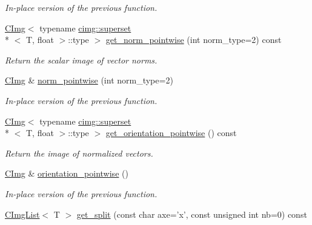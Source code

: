\begin{DoxyCompactItemize}
\begin{DoxyCompactList}\small\item\em In-\/place version of the previous function. \end{DoxyCompactList}\item 
\hyperlink{structcimg__library_1_1_c_img}{C\-Img}$<$ typename \hyperlink{structcimg__library_1_1cimg_1_1superset}{cimg\-::superset}\\*
$<$ T, float $>$\-::type $>$ \hyperlink{structcimg__library_1_1_c_img_a468e303545c56e068bf2f8e90b203be2}{get\-\_\-norm\-\_\-pointwise} (int norm\-\_\-type=2) const 
\begin{DoxyCompactList}\small\item\em Return the scalar image of vector norms. \end{DoxyCompactList}\item 
\hypertarget{structcimg__library_1_1_c_img_a2c7af7a94c6ada6645257c8cd0ffa791}{\hyperlink{structcimg__library_1_1_c_img}{C\-Img} \& \hyperlink{structcimg__library_1_1_c_img_a2c7af7a94c6ada6645257c8cd0ffa791}{norm\-\_\-pointwise} (int norm\-\_\-type=2)}\label{structcimg__library_1_1_c_img_a2c7af7a94c6ada6645257c8cd0ffa791}

\begin{DoxyCompactList}\small\item\em In-\/place version of the previous function. \end{DoxyCompactList}\item 
\hyperlink{structcimg__library_1_1_c_img}{C\-Img}$<$ typename \hyperlink{structcimg__library_1_1cimg_1_1superset}{cimg\-::superset}\\*
$<$ T, float $>$\-::type $>$ \hyperlink{structcimg__library_1_1_c_img_a4d834ce02a75be3c91b69d1a932f1707}{get\-\_\-orientation\-\_\-pointwise} () const 
\begin{DoxyCompactList}\small\item\em Return the image of normalized vectors. \end{DoxyCompactList}\item 
\hypertarget{structcimg__library_1_1_c_img_a361a2f26fd4692a9f429982d2a071985}{\hyperlink{structcimg__library_1_1_c_img}{C\-Img} \& \hyperlink{structcimg__library_1_1_c_img_a361a2f26fd4692a9f429982d2a071985}{orientation\-\_\-pointwise} ()}\label{structcimg__library_1_1_c_img_a361a2f26fd4692a9f429982d2a071985}

\begin{DoxyCompactList}\small\item\em In-\/place version of the previous function. \end{DoxyCompactList}\item 
\hypertarget{structcimg__library_1_1_c_img_a4c5863135f8535b0603cd5e5f9eb48df}{\hyperlink{structcimg__library_1_1_c_img_list}{C\-Img\-List}$<$ T $>$ \hyperlink{structcimg__library_1_1_c_img_a4c5863135f8535b0603cd5e5f9eb48df}{get\-\_\-split} (const char axe='x', const unsigned int nb=0) const }\label{structcimg__library_1_1_c_img_a4c5863135f8535b0603cd5e5f9eb48df}


\end{DoxyCompactItemize}
